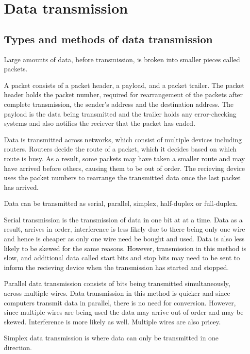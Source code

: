 \section{Data transmission}
\subsection{Types and methods of data transmission}

Large amounts of data, before transmission, is broken into smaller pieces called packets. 

A packet consists of a packet header, a payload, and a packet trailer. The packet header holds
the packet number, required for rearrangement of the packets after complete transmission, the
sender's address and the destination address. The payload is the data being transmitted and the
trailer holds any error-checking systems and also notifies the reciever that the packet has ended.

Data is transmitted across networks, which consist of multiple devices including routers. Routers
decide the route of a packet, which it decides based on which route is busy. As a result, some
packets may have taken a smaller route and may have arrived before others, causing them to be out
of order. The recieving device uses the packet numbers to rearrange the transmitted data once the
last packet has arrived.

Data can be transmitted as serial, parallel, simplex, half-duplex or full-duplex.

Serial transmission is the transmission of data in one bit at at a time. Data as a result, arrives
in order, interference is less likely due to there being only one wire and hence is cheaper as only
one wire need be bought and used. Data is also less likely to be skewed for the same reasons. 
However, transmission in this method is slow, and additional data called start bits and stop bits
may need to be sent to inform the recieving device when the transmission has started and stopped.

Parallel data transmission consists of bits being transmitted simultaneously, across multiple
wires. Data transmission in this method is quicker and since computers transmit data in parallel,
there is no need for conversion. However, since multiple wires are being used the data may arrive
out of order and may be skewed. Interference is more likely as well. Multiple wires are also
pricey.

Simplex data transmission is where data can only be transmitted in one direction.

